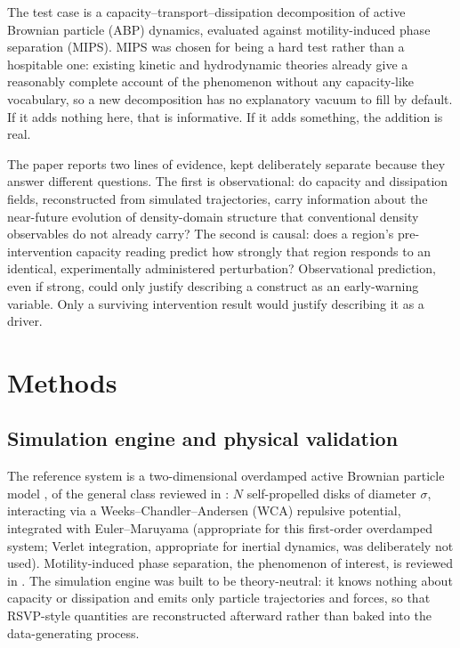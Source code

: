 \documentclass[11pt]{article}
\begin{document}
The test case is a capacity--transport--dissipation decomposition of active Brownian particle (ABP) dynamics, evaluated against motility-induced phase separation (MIPS). MIPS was chosen for being a hard test rather than a hospitable one: existing kinetic and hydrodynamic theories already give a reasonably complete account of the phenomenon without any capacity-like vocabulary, so a new decomposition has no explanatory vacuum to fill by default. If it adds nothing here, that is informative. If it adds something, the addition is real.

The paper reports two lines of evidence, kept deliberately separate because they answer different questions. The first is observational: do capacity and dissipation fields, reconstructed from simulated trajectories, carry information about the near-future evolution of density-domain structure that conventional density observables do not already carry? The second is causal: does a region's pre-intervention capacity reading predict how strongly that region responds to an identical, experimentally administered perturbation? Observational prediction, even if strong, could only justify describing a construct as an early-warning variable. Only a surviving intervention result would justify describing it as a driver.

\section{Methods}

\subsection{Simulation engine and physical validation}

The reference system is a two-dimensional overdamped active Brownian particle model \cite{Fily2012,Redner2013}, of the general class reviewed in \cite{Marchetti2013,Bechinger2016}: $N$ self-propelled disks of diameter $\sigma$, interacting via a Weeks--Chandler--Andersen (WCA) repulsive potential, integrated with Euler--Maruyama (appropriate for this first-order overdamped system; Verlet integration, appropriate for inertial dynamics, was deliberately not used). Motility-induced phase separation, the phenomenon of interest, is reviewed in \cite{CatesTailleur2015}. The simulation engine was built to be theory-neutral: it knows nothing about capacity or dissipation and emits only particle trajectories and forces, so that RSVP-style quantities are reconstructed afterward rather than baked into the data-generating process.
\end{document}
